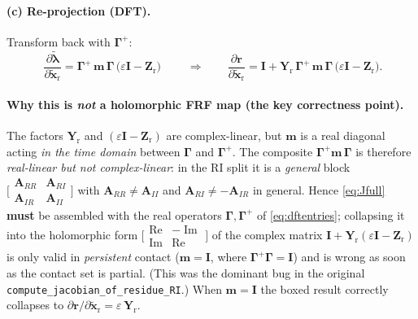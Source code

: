 \documentclass[11pt]{article}
\newcommand{\Ib}{\bm{I}}
\newcommand{\Gam}{\bm{\Gamma}}
\newcommand{\xr}{\tilde{\bm{x}}_{\mathrm r}}      %
\newcommand{\lamt}{\tilde{\bm{\lambda}}}          %
\newcommand{\Yr}{\bm{Y}_{\mathrm r}}
\newcommand{\Zr}{\bm{Z}_{\mathrm r}}
\newcommand{\Real}{\operatorname{Re}}
\newcommand{\Imag}{\operatorname{Im}}
\begin{document}
\paragraph{(c) Re-projection (DFT).} Transform back with $\Gam^{+}$:
\begin{equation}
\boxed{\;
\frac{\partial\lamt}{\partial\xr}
=\Gam^{+}\,\bm m\,\Gam\,\bigl(\varepsilon\Ib-\Zr\bigr)\;}
\qquad\Longrightarrow\qquad
\frac{\partial\bm r}{\partial\xr}
=\Ib+\Yr\,\Gam^{+}\,\bm m\,\Gam\,\bigl(\varepsilon\Ib-\Zr\bigr).
\label{eq:Jfull}
\end{equation}

\paragraph{Why this is \emph{not} a holomorphic FRF map (the key
correctness point).} The factors $\Yr$ and $(\varepsilon\Ib-\Zr)$ are
complex-linear, but $\bm m$ is a real diagonal acting \emph{in the time
domain} between $\Gam$ and $\Gam^{+}$. The composite
$\Gam^{+}\bm m\,\Gam$ is therefore \emph{real-linear but not complex-linear}:
in the RI split it is a \emph{general} block
$\bigl[\begin{smallmatrix}\bm A_{RR}&\bm A_{RI}\\\bm A_{IR}&\bm A_{II}\end{smallmatrix}\bigr]$
with $\bm A_{RR}\neq\bm A_{II}$ and $\bm A_{RI}\neq-\bm A_{IR}$ in general.
Hence \eqref{eq:Jfull} \textbf{must} be assembled with the real operators
$\Gam,\Gam^{+}$ of \eqref{eq:dftentries}; collapsing it into the
holomorphic form $\bigl[\begin{smallmatrix}\Real&-\Imag\\\Imag&\Real\end{smallmatrix}\bigr]$
of the complex matrix $\Ib+\Yr(\varepsilon\Ib-\Zr)$ is only valid in
\emph{persistent} contact ($\bm m=\Ib$, where $\Gam^{+}\Gam=\Ib$) and is
wrong as soon as the contact set is partial. (This was the dominant bug in
the original \texttt{compute\_jacobian\_of\_residue\_RI}.) When $\bm m=\Ib$
the boxed result correctly collapses to
$\partial\bm r/\partial\xr=\varepsilon\,\Yr$.
\end{document}
